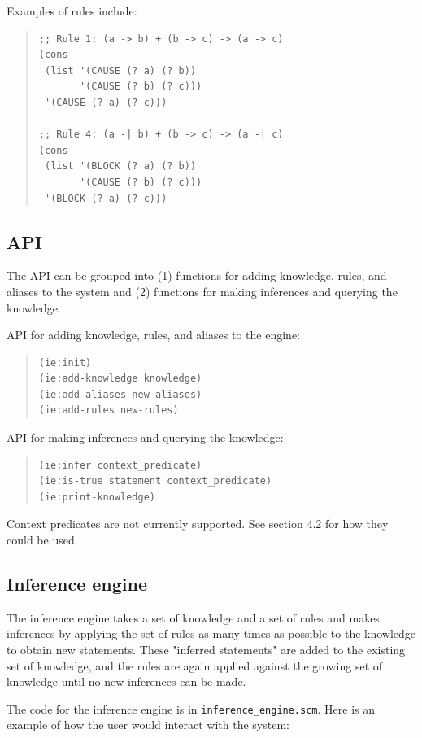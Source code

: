\documentclass[11pt]{article}
\begin{document}
Examples of rules include:

\begin{quote}
\begin{verbatim}
;; Rule 1: (a -> b) + (b -> c) -> (a -> c)
(cons
 (list '(CAUSE (? a) (? b))
       '(CAUSE (? b) (? c)))
 '(CAUSE (? a) (? c)))

;; Rule 4: (a -| b) + (b -> c) -> (a -| c)
(cons
 (list '(BLOCK (? a) (? b))
       '(CAUSE (? b) (? c)))
 '(BLOCK (? a) (? c)))
\end{verbatim}
\end{quote}
\subsection{API}
\label{sec-2-2}
The API can be grouped into (1) functions for adding knowledge, rules, and aliases to the system and (2) functions for making inferences and querying the knowledge.

API for adding knowledge, rules, and aliases to the engine:

\begin{quote}
\begin{verbatim}
(ie:init)
(ie:add-knowledge knowledge)
(ie:add-aliases new-aliases)
(ie:add-rules new-rules)
\end{verbatim}
\end{quote}

API for making inferences and querying the knowledge:

\begin{quote}
\begin{verbatim}
(ie:infer context_predicate)
(ie:is-true statement context_predicate)
(ie:print-knowledge)
\end{verbatim}
\end{quote}

Context predicates are not currently supported. See section 4.2 for how they could be used.
\subsection{Inference engine}
\label{sec-2-3}
The inference engine takes a set of knowledge and a set of rules and makes inferences by applying the set of rules as many times as possible to the knowledge to obtain new statements. These "inferred statements" are added to the existing set of knowledge, and the rules are again applied against the growing set of knowledge until no new inferences can be made.

The code for the inference engine is in \texttt{inference\_engine.scm}. Here is an example of how the user would interact with the system:
\end{document}
